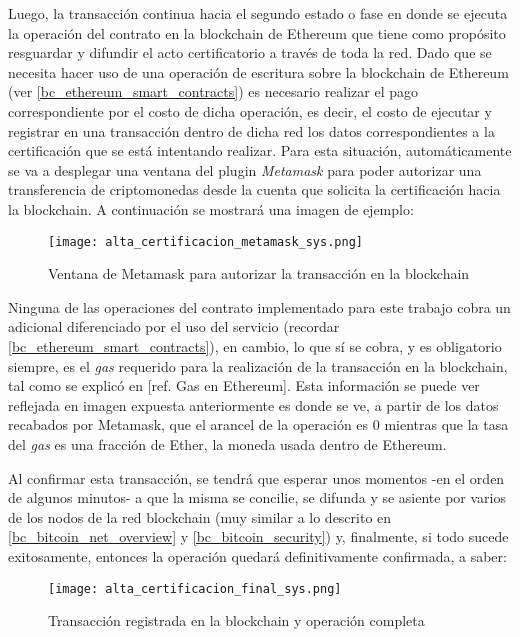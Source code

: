 Luego, la transacción continua hacia el segundo estado o fase en donde se ejecuta la operación del contrato en la blockchain de Ethereum que tiene como propósito resguardar y difundir el acto certificatorio a través de toda la red. Dado que se necesita hacer uso de una operación de escritura sobre la blockchain de Ethereum (ver \ref{bc_ethereum_smart_contracts}) es necesario realizar el pago correspondiente por el costo de dicha operación, es decir, el costo de ejecutar y registrar en una transacción dentro de dicha red los datos correspondientes a la certificación que se está intentando realizar. Para esta situación, automáticamente se va a desplegar una ventana del plugin \textit{Metamask} para poder autorizar una transferencia de criptomonedas desde la cuenta que solicita la certificación hacia la blockchain. A continuación se mostrará una imagen de ejemplo:

\begin{figure}[H]
  \texttt{[image: alta\_certificacion\_metamask\_sys.png]}
  \centering
  \caption{Ventana de Metamask para autorizar la transacción en la blockchain}
  \label{fig:alta-certificacion-metamask-sys}
\end{figure}

Ninguna de las operaciones del contrato implementado para este trabajo cobra un adicional diferenciado por el uso del servicio (recordar \ref{bc_ethereum_smart_contracts}), en cambio, lo que sí se cobra, y es obligatorio siempre, es el \textit{gas} requerido para la realización de la transacción en la blockchain, tal como se explicó en [ref. Gas en Ethereum]. Esta información se puede ver reflejada en imagen expuesta anteriormente es donde se ve, a partir de los datos recabados por Metamask, que el arancel de la operación es 0 mientras que la tasa del \textit{gas} es una fracción de Ether, la moneda usada dentro de Ethereum.

Al confirmar esta transacción, se tendrá que esperar unos momentos -en el orden de algunos minutos- a que la misma se concilie, se difunda y se asiente por varios de los nodos de la red blockchain (muy similar a lo descrito en \ref{bc_bitcoin_net_overview} y \ref{bc_bitcoin_security}) y, finalmente, si todo sucede exitosamente, entonces la operación quedará definitivamente confirmada, a saber:

\begin{figure}[H]
  \texttt{[image: alta\_certificacion\_final\_sys.png]}
  \centering
  \caption{Transacción registrada en la blockchain y operación completa}
  \label{fig:alta-certificacion-final-sys}
\end{figure}

